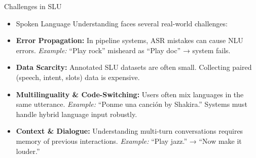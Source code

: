\begin{frame}[allowframebreaks]{Challenges in SLU}

\begin{itemize}
    \item Spoken Language Understanding faces several real-world challenges:

    \item \textbf{Error Propagation:}  
    In pipeline systems, ASR mistakes can cause NLU errors.  
    \textit{Example:} ``Play rock'' misheard as ``Play doc'' → system fails.

    \item \textbf{Data Scarcity:}  
    Annotated SLU datasets are often small. Collecting paired (speech, intent, slots) data is expensive.

    \item \textbf{Multilinguality \& Code-Switching:}
    Users often mix languages in the same utterance.  
    \textit{Example:} ``Ponme una canción by Shakira.''  
    Systems must handle hybrid language input robustly.

    \item \textbf{Context \& Dialogue:}
    Understanding multi-turn conversations requires memory of previous interactions.  
    \textit{Example:} ``Play jazz.'' → ``Now make it louder.''
\end{itemize}

\end{frame}


